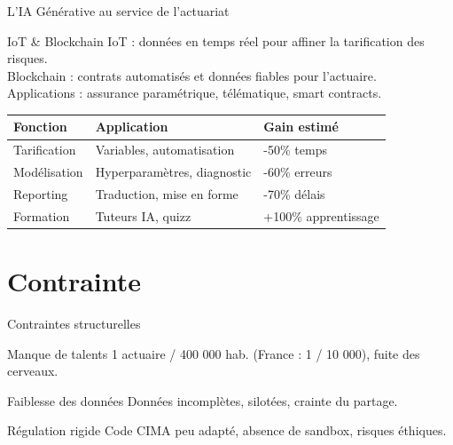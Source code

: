 \documentclass{beamer}
\begin{document}
\begin{frame}{L’IA Générative au service de l’actuariat}
	
	\begin{block}{ IoT \& Blockchain}
		IoT : données en temps réel pour affiner la tarification des risques.\\
		Blockchain : contrats automatisés et données fiables pour l’actuaire.\\
		Applications : assurance paramétrique, télématique, smart contracts.
	\end{block}
	\begin{tabular}{|l|l|l|}
		\hline
		Fonction & Application & Gain estimé \\
		\hline
		Tarification & Variables, automatisation & -50\% temps \\
		Modélisation & Hyperparamètres, diagnostic & -60\% erreurs \\
		Reporting & Traduction, mise en forme & -70\% délais \\
		Formation & Tuteurs IA, quizz & +100\% apprentissage \\
		\hline
	\end{tabular}
\end{frame}

\section{Contrainte}
\begin{frame}{Contraintes structurelles}
	\begin{block}{ Manque de talents}
		1 actuaire / 400 000 hab. (France : 1 / 10 000), fuite des cerveaux.
	\end{block}
	\begin{block}{Faiblesse des données}
		Données incomplètes, silotées, crainte du partage.
	\end{block}
	\begin{block}{ Régulation rigide}
		Code CIMA peu adapté, absence de sandbox, risques éthiques.
	\end{block}
\end{frame}

\end{document}
